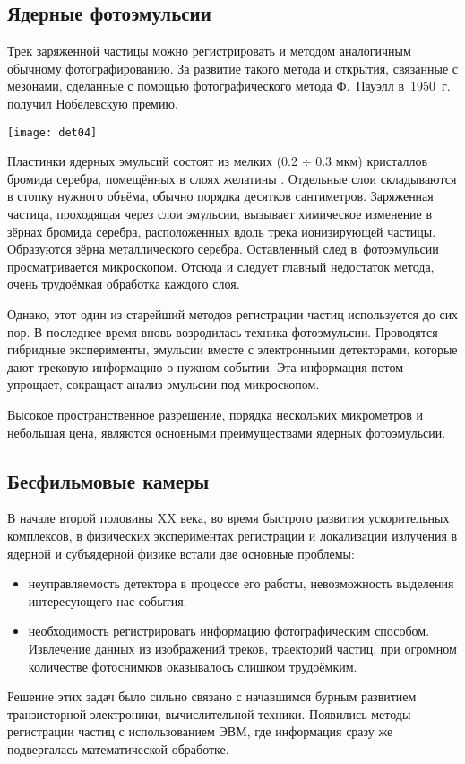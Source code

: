 
\vspace{0.6cm}
\subsection{Ядерные фотоэмульсии}
Трек заряженной частицы можно регистрировать и методом аналогичным
обычному фотографированию. За развитие такого метода и открытия,
связанные с мезонами, сделанные с помощью фотографического метода
Ф.~Пауэлл в~1950~г. получил Нобелевскую премию.
\begin{floatingfigure}[r]{5.0cm}
  \hspace{-0.6cm}
  \texttt{[image: det04]}
\end{floatingfigure}
Пластинки ядерных эмульсий состоят из мелких (0.2 $\div$ 0.3 мкм)
кристаллов бромида серебра, помещённых в слоях желатины \cite{nak:06}.
Отдельные слои складываются в стопку нужного объёма, обычно порядка
десятков сантиметров. Заряженная частица, проходящая через слои эмульсии,
вызывает химическое изменение в зёрнах бромида серебра, расположенных
вдоль трека ионизирующей частицы. Образуются зёрна металлического
серебра. Оставленный след в~фотоэмульсии просматривается микроскопом.
Отсюда и следует главный недостаток метода, очень трудоёмкая обработка
каждого слоя.

Однако, этот один из старейший методов регистрации частиц используется
до сих пор. В последнее время вновь возродилась техника фотоэмульсии.
Проводятся гибридные эксперименты, эмульсии вместе с электронными
детекторами, которые дают трековую информацию о нужном событии. Эта
информация потом упрощает, сокращает анализ эмульсии под микроскопом.

Высокое пространственное разрешение, порядка нескольких микрометров и
небольшая цена, являются основными преимуществами ядерных фотоэмульсии.

\subsection{Бесфильмовые камеры}
В начале второй половины XX века, во время быстрого развития ускорительных
комплексов, в физических экспериментах регистрации и локализации излучения
в ядерной и субъядерной физике встали две основные проблемы:
\begin{itemize}
\item неуправляемость детектора в процессе его работы, невозможность
  выделения интересующего нас события.
\item необходимость регистрировать информацию фотографическим
  способом. Извлечение данных из изображений треков, траекторий частиц,
  при огромном количестве фотоснимков оказывалось слишком трудоёмким.
\end{itemize}
Решение этих задач было сильно связано с начавшимся бурным развитием
транзисторной электроники, вычислительной техники. Появились методы
регистрации частиц с использованием ЭВМ, где информация сразу же
подвергалась математической обработке.

